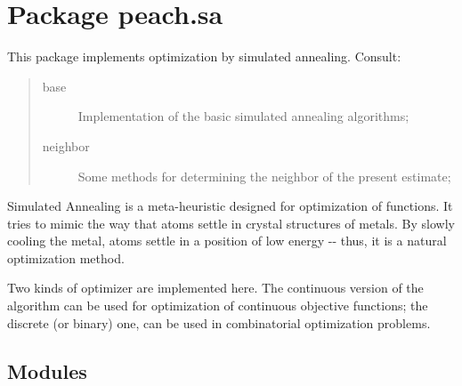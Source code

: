 %
%
%


\section{Package peach.sa}

    \label{peach:sa}

This package implements optimization by simulated annealing. Consult:
%
\begin{quote}
%
\begin{description}
\item[{base}] \leavevmode 
Implementation of the basic simulated annealing algorithms;

\item[{neighbor}] \leavevmode 
Some methods for determining the neighbor of the present estimate;

\end{description}

\end{quote}

Simulated Annealing is a meta-heuristic designed for optimization of functions.
It tries to mimic the way that atoms settle in crystal structures of metals. By
slowly cooling the metal, atoms settle in a position of low energy -{}- thus, it
is a natural optimization method.

Two kinds of optimizer are implemented here. The continuous version of the
algorithm can be used for optimization of continuous objective functions; the
discrete (or binary) one, can be used in combinatorial optimization problems.


\subsection{Modules}

